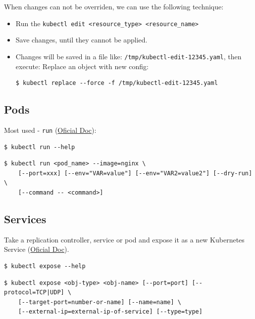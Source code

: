 \documentclass{article}
\newenvironment{blocktemplateI}[1]{%
    \tcolorbox[beamer,%
    noparskip,breakable,
    colframe=Violet,%
    colbacklower=Black,%
    title=#1]}%
    {\endtcolorbox}
\newenvironment{codetemplate}[1][]{%
  \mybasecolorbox[#1]
  \itshape
}{%
  \endmybasecolorbox
}
\begin{document}
\begin{blocktemplateI}{NOTE}
When changes can not be overriden, we can use the following technique:
\begin{itemize}
    \item Run the \verb|kubectl edit <resource_type> <resource_name>|
    \item Save changes, until they cannot be applied.
    \item Changes will be saved in a file like: \verb|/tmp/kubectl-edit-12345.yaml|, then execute:
Replace an object with new config:
\begin{codetemplate}
\begin{verbatim}
$ kubectl replace --force -f /tmp/kubectl-edit-12345.yaml
\end{verbatim}
\end{codetemplate}
\end{itemize}
\end{blocktemplateI}

\subsection{Pods}
Most used - \verb|run| (\href{https://jamesdefabia.github.io/docs/user-guide/kubectl/kubectl_run/}{Oficial Doc}):
\begin{codetemplate}{}
\begin{verbatim}
$ kubectl run --help
\end{verbatim}
\end{codetemplate}
\begin{codetemplate}
\begin{verbatim}
$ kubectl run <pod_name> --image=nginx \
    [--port=xxx] [--env="VAR=value"] [--env="VAR2=value2"] [--dry-run] \
    [--command -- <command>]
\end{verbatim}
\end{codetemplate}

\subsection{Services}
Take a replication controller, service or pod and expose it as a new Kubernetes Service (\href{https://jamesdefabia.github.io/docs/user-guide/kubectl/kubectl_expose/}{Oficial Doc}).

\begin{codetemplate}{}
\begin{verbatim}
$ kubectl expose --help
\end{verbatim}
\end{codetemplate}
\begin{codetemplate}{}
\begin{verbatim}
$ kubectl expose <obj-type> <obj-name> [--port=port] [--protocol=TCP|UDP] \
    [--target-port=number-or-name] [--name=name] \
    [--external-ip=external-ip-of-service] [--type=type]
\end{verbatim}
\end{codetemplate}
\end{document}
